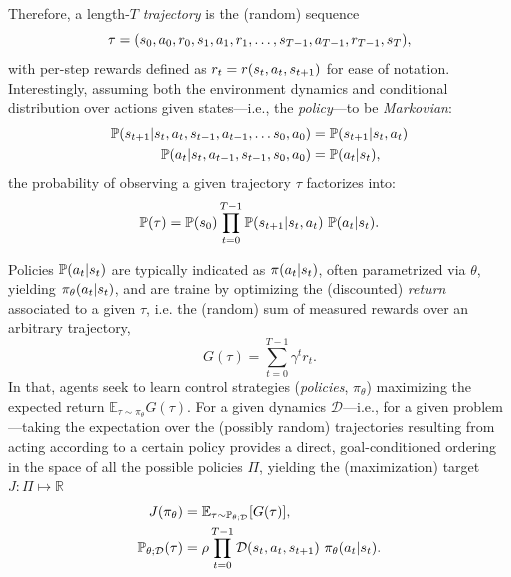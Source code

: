 Therefore, a length-\(T\) \emph{trajectory} is the (random) sequence
\begin{equation}\label{eq:trajectory_definition}
    \tau = (s_0, a_0, r_0, s_1, a_1, r_1, \dots, s_{T-1}, a_{T-1}, r_{T-1}, s_T),
\end{equation}
with per-step rewards defined as \(r_t = r (s_t, a_t, s_{t+1}) \) for ease of notation.
Interestingly, assuming both the environment dynamics and conditional distribution over actions given states---i.e., the \emph{policy}---to be \emph{Markovian}:
%
\begin{align}
\mathbb P(s_{t+1} \vert s_t, a_t, s_{t-1}, a_{t-1}, \dots s_0, a_0 ) &= \mathbb P (s_{t+1} \vert s_t, a_t) \label{eq:dynamics_markovian} \\
\mathbb P(a_t \vert s_t, a_{t-1}, s_{t-1}, s_0, a_0) &= \mathbb P(a_t \vert s_t), \label{eq:policy_markovian}
\end{align}
%
the probability of observing a given trajectory \( \tau \) factorizes into:
\begin{equation}\label{eq:traj_prob}
    \mathbb P(\tau) = \mathbb P (s_0) \prod_{t=0}^{T-1} \mathbb P (s_{t+1} \vert s_t, a_t) \ \mathbb P(a_t \vert s_t).
\end{equation}

Policies \( \mathbb P(a_t \vert s_t) \) are typically indicated as \( \pi(a_t \vert s_t) \), often parametrized via \( \theta \), yielding \( \pi_\theta (a_t \vert s_t )\), and are traine by optimizing the (discounted) \emph{return} associated to a given \( \tau \), i.e. the (random) sum of measured rewards over an arbitrary trajectory, 
\[
    G(\tau) = \sum_{t=0}^{T-1} \gamma^{t} r_t.
\]
In that, agents seek to learn control strategies (\emph{policies}, \( \pi_\theta \)) maximizing the expected return \( \mathbb E_{\tau \sim \pi_\theta} G(\tau) \). 
For a given dynamics \( \mathcal D \)---i.e., for a given problem---taking the expectation over the (possibly random) trajectories resulting from acting according to a certain policy provides a direct, goal-conditioned ordering in the space of all the possible policies \( \Pi \), yielding the (maximization) target \( J : \Pi \mapsto \mathbb R \)
\begin{align}
    J(\pi_\theta) &= \mathbb E_{\tau \sim \mathbb P_{\theta; \mathcal D}} \left[ G(\tau) \right], \label{eq:RL-j-function} \\
    \mathbb P_{\theta; \mathcal D} (\tau) &= \rho \prod_{t=0}^{T-1} \mathcal D \transition \ \pi_\theta (\action \vert \state).\label{eq:traj-probabilities-for-policies}
\end{align}

